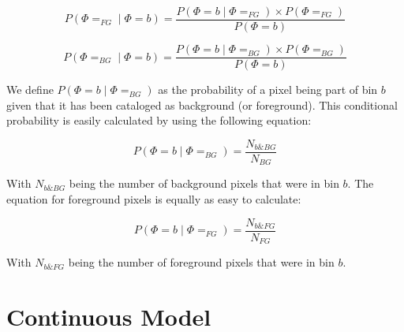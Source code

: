 \documentclass[a4paper,12pt]{report}
\begin{document}

\begin{equation}
P(\Phi=_{FG} \mid \Phi=b) = \frac{P(\Phi=b \mid\Phi=_{FG}) \times P(\Phi=_{FG})}
                               {P(\Phi=b)}
\end{equation}

\begin{equation}
P(\Phi=_{BG} \mid \Phi=b) = \frac{P(\Phi=b \mid\Phi=_{BG}) \times P(\Phi=_{BG})}
                               {P(\Phi=b)}
\end{equation}

We define $P(\Phi=b \mid\Phi=_{BG})$ as the probability of a pixel being part of
bin $b$ given that it has been cataloged as background (or foreground). This
conditional probability is easily calculated by using the following equation:

\begin{equation}
P(\Phi=b \mid\Phi=_{BG}) = \frac{N_{b\&BG}}{N_{BG}}
\end{equation}

With $N_{b\&BG}$ being the number of background pixels that were in bin $b$. The
equation for foreground pixels is equally as easy to calculate:

\begin{equation}
P(\Phi=b \mid\Phi=_{FG}) = \frac{N_{b\&FG}}{N_{FG}}
\end{equation}

With $N_{b\&FG}$ being the number of foreground pixels that were in bin $b$.

\section{Continuous Model}

\listoffixmes
\end{document}
